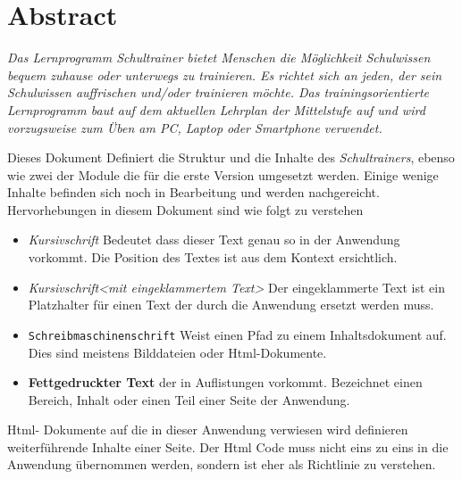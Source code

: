 \chapter{ Abstract }
\label{cha:abstract}
\emph{Das Lernprogramm \emph{Schultrainer} bietet Menschen die Möglichkeit Schulwissen
bequem zuhause oder unterwegs zu trainieren.
Es richtet sich an jeden, der sein Schulwissen auffrischen
und/oder trainieren möchte. Das trainingsorientierte Lernprogramm baut auf dem
aktuellen Lehrplan der Mittelstufe auf und wird vorzugsweise zum Üben am PC,
Laptop oder Smartphone verwendet.}

\vfill
Dieses Dokument Definiert die Struktur und die Inhalte des \emph{Schultrainers}, ebenso wie zwei der Module die für die erste Version umgesetzt werden. 
Einige wenige Inhalte befinden sich noch in Bearbeitung und werden nachgereicht. 
Hervorhebungen in diesem Dokument sind wie folgt zu verstehen
\begin{itemize}
  \item \emph{Kursivschrift} Bedeutet dass dieser Text genau so in der Anwendung vorkommt. Die Position des Textes ist aus dem Kontext ersichtlich.
  \item \emph{Kursivschrift<mit eingeklammertem Text>} Der eingeklammerte Text ist ein Platzhalter für einen Text der durch die Anwendung ersetzt werden muss.
 \item \texttt{Schreibmaschinenschrift} Weist einen Pfad zu einem Inhaltsdokument auf. Dies sind meistens Bilddateien oder Html-Dokumente. 
 \item \textbf{Fettgedruckter Text} der in Auflistungen vorkommt. Bezeichnet einen Bereich, Inhalt oder einen Teil einer Seite der Anwendung.
\end{itemize}
Html- Dokumente auf die in dieser Anwendung verwiesen wird definieren weiterführende Inhalte einer Seite. 
Der Html Code muss nicht eins zu eins in die Anwendung übernommen werden, sondern ist eher als Richtlinie zu verstehen.
